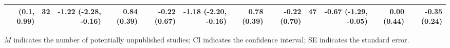\begin{table}
\begin{threeparttable}
\begin{tabular}[t]{rrrrrrrrrrrr}
(0.1, 0.99) & 32 & -1.22 (-2.28, -0.16) & 0.84 (0.39) & -0.22 (0.67) & -1.18 (-2.20, -0.16) & 0.78 (0.39) & -0.22 (0.70) & 47 & -0.67 (-1.29, -0.05) & 0.00 (0.44) & -0.35 (0.24)\\
\bottomrule
\end{tabular}
\begin{tablenotes}
\item $M$ indicates the number of potentially unpublished studies; 
           CI indicates the confidence interval; 
           SE indicates the standard error.
\end{tablenotes}
\end{threeparttable}
\end{table}
